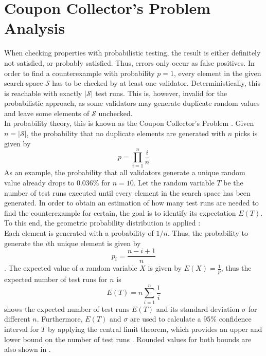 \section{Coupon Collector's Problem Analysis}\label{sec:coupon}
When checking properties with probabilistic testing, the result is either definitely not satisfied, or probably satisfied. Thus, errors only occur as false positives. In order to find a counterexample with probability $p = 1$, every element in the given search space $\mathcal{S}$ has to be checked by at least one validator. Deterministically, this is reachable with exactly $|\mathcal{S}|$ test runs. This is, however, invalid for the probabilistic approach, as some validators may generate duplicate random values and leave some elements of $\mathcal{S}$ unchecked. \\
In probability theory, this is known as the Coupon Collector's Problem \cite{croucher_collecting_2006}. Given $n = |\mathcal{S}|$, the probability that no duplicate elements are generated with $n$ picks is given by
\begin{equation*}
    p = \prod_{i=1}^{n} \frac{i}{n}
\end{equation*}
As an example, the probability that all validators generate a unique random value already drops to $0.036\%$ for $n = 10$. Let the random variable $T$ be the number of test runs executed until every element in the search space has been generated. In order to obtain an estimation of how many test runs are needed to find the counterexample for certain, the goal is to identify its expectation $E(T)$. To this end, the geometric probability distribution is applied \cite{croucher_collecting_2006}:\\
Each element is generated with a probability of $1/n$. Thus, the probability to generate the $i$th unique element is given by 
\begin{equation}
    p_i = \frac{n-i+1}{n}
\end{equation}
\cite{croucher_collecting_2006}. The expected value of a random variable $X$ is given by $E(X) = \frac{1}{p}$\cite{croucher_collecting_2006}, thus the expected number of test runs for $n$ is 
\begin{equation}
E(T) = n \sum_{i=1}^{n} \frac{1}{i}
\end{equation}
 shows the expected number of test runs $E(T)$ and its standard deviation $\sigma$ for different $n$. Furthermore, $E(T)$ and $\sigma$ are used to calculate a 95\% confidence interval for $T$ by applying the central limit theorem, which provides an upper and lower bound on the number of test runs \cite{croucher_collecting_2006}. Rounded values for both bounds are also shown in .
